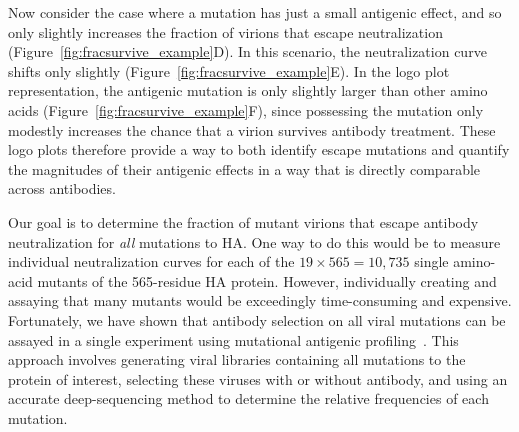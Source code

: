 \documentclass[11pt]{article}
\begin{document}
Now consider the case where a mutation has just a small antigenic effect, and so only slightly increases the fraction of virions that escape neutralization (Figure~\ref{fig:fracsurvive_example}D).
In this scenario, the neutralization curve shifts only slightly (Figure~\ref{fig:fracsurvive_example}E).
In the logo plot representation, the antigenic mutation is only slightly larger than other amino acids (Figure~\ref{fig:fracsurvive_example}F), since possessing the mutation only modestly increases the chance that a virion survives antibody treatment.
These logo plots therefore provide a way to both identify escape mutations and quantify the magnitudes of their antigenic effects in a way that is directly comparable across antibodies.

Our goal is to determine the fraction of mutant virions that escape antibody neutralization for \emph{all} mutations to HA.
One way to do this would be to measure individual neutralization curves for each of the $19\times565 = 10,735$ single amino-acid mutants of the 565-residue HA protein.
However, individually creating and assaying that many mutants would be exceedingly time-consuming and expensive.
Fortunately, we have shown that antibody selection on all viral mutations can be assayed in a single experiment using mutational antigenic profiling~\citep{doud2017complete,dingens2017comprehensive}.
This approach involves generating viral libraries containing all mutations to the protein of interest, selecting these viruses with or without antibody, and using an accurate deep-sequencing method to determine the relative frequencies of each mutation.
\end{document}

